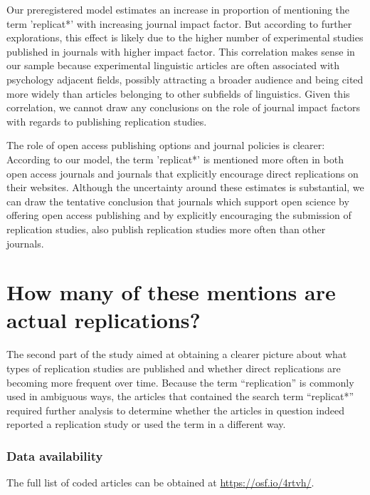 \documentclass[]{elsarticle} %
\begin{document}
Our preregistered model estimates an increase in proportion of
mentioning the term 'replicat*' with increasing journal impact factor.
But according to further explorations, this effect is likely due to the
higher number of experimental studies published in journals with higher
impact factor. This correlation makes sense in our sample because
experimental linguistic articles are often associated with psychology
adjacent fields, possibly attracting a broader audience and being cited
more widely than articles belonging to other subfields of linguistics.
Given this correlation, we cannot draw any conclusions on the role of
journal impact factors with regards to publishing replication studies.

The role of open access publishing options and journal policies is
clearer: According to our model, the term 'replicat*' is mentioned more
often in both open access journals and journals that explicitly
encourage direct replications on their websites. Although the
uncertainty around these estimates is substantial, we can draw the
tentative conclusion that journals which support open science by
offering open access publishing and by explicitly encouraging the
submission of replication studies, also publish replication studies more
often than other journals.

\hypertarget{how-many-of-these-mentions-are-actual-replications}{%
\section{How many of these mentions are actual
replications?}\label{how-many-of-these-mentions-are-actual-replications}}

The second part of the study aimed at obtaining a clearer picture about
what types of replication studies are published and whether direct
replications are becoming more frequent over time. Because the term
``replication'' is commonly used in ambiguous ways, the articles that
contained the search term ``replicat*'' required further analysis to
determine whether the articles in question indeed reported a replication
study or used the term in a different way.

\hypertarget{data-availability-1}{%
\subsubsection{Data availability}\label{data-availability-1}}

The full list of coded articles can be obtained at
\url{https://osf.io/4rtvh/}.
\end{document}
